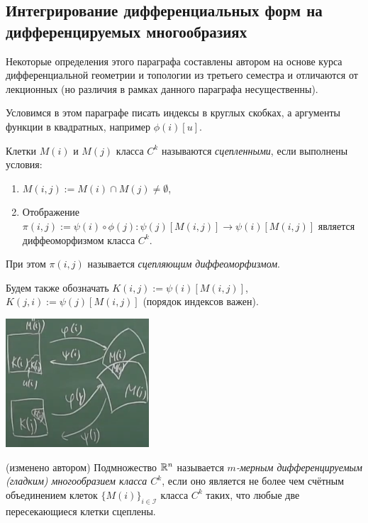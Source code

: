 \subsection{Интегрирование дифференциальных форм на дифференцируемых многообразиях}

Некоторые определения этого параграфа составлены автором на основе курса дифференциальной геометрии и топологии из третьего семестра и отличаются от лекционных (но различия в рамках данного параграфа несущественны).

\begin{designation}
Условимся в этом параграфе писать индексы в круглых скобках, а аргументы функции в квадратных, например $\phi(i)[u]$.
\end{designation}

\begin{definition}
	Клетки $M(i)$ и $M(j)$ класса $C^k$ называются \textit{сцепленными}, если выполнены условия:
	\begin{enumerate}
		\item $M(i,j) := M(i) \cap M(j) \neq \emptyset$,
		
		\item Отображение $\pi(i, j) := \psi(i) \circ \phi(j) \colon \psi(j)[M(i,j)] \to \psi(i)[M(i,j)]$ является диффеоморфизмом класса $C^k$.
	\end{enumerate}
	При этом $\pi(i,j)$ называется \textit{сцепляющим диффеоморфизмом}.
\end{definition}

\begin{designation}
Будем также обозначать $K(i,j) := \psi(i)[M(i,j)]$, $K(j,i) := \psi(j)[M(i,j)]$ (порядок индексов важен).
\end{designation}

\begin{center}
	\includegraphics[width=0.4\textwidth]{images/manifold.png}
\end{center}

\begin{definition} (изменено автором)
	Подмножество $\mathbb{R}^n$ называется \textit{$m$-мерным дифференцируемым (гладким) многообразием класса $C^k$}, если оно является не более чем счётным объединением клеток $\{M(i)\}_{i \in \mathcal I}$ класса $C^k$ таких, что любые две пересекающиеся клетки сцеплены.
\end{definition}

